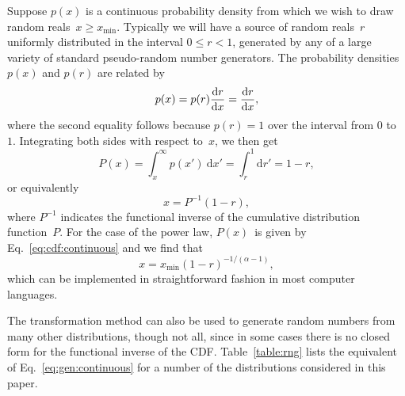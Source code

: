 \documentclass[final]{siamltex}
\renewcommand{\d}{\mathrm{d}}
\newcommand{\xmin}{\ensuremath{x_{\min}}}
\begin{document}
\begin{appendix}
Suppose $p(x)$ is a continuous probability density from which we wish to
draw random reals~$x\ge\xmin$.  Typically we will have a source of random
reals~$r$ uniformly distributed in the interval $0\le r<1$, generated by
any of a large variety of standard pseudo-random number generators.  The
probability densities $p(x)$ and $p(r)$ are related by
\begin{equation}
p(x) = p(r) {\d r\over\d x} = {\d r\over\d x},
\end{equation}
where the second equality follows because $p(r)=1$ over the interval from
$0$ to~$1$.  Integrating both sides with respect to~$x$, we then get
\begin{equation}
\label{eq:transformation1}
P(x) = \int_x^\infty p(x') \>\d x' = \int_r^1 \d r' = 1 - r,
\end{equation}
or equivalently
\begin{equation}
\label{eq:transformation2}
x = P^{-1}(1-r),
\end{equation}
where $P^{-1}$ indicates the functional inverse of the cumulative
distribution function~$P$.  For the case of the power law, $P(x)$~is given
by Eq.~\eqref{eq:cdf:continuous} and we find that
\begin{equation}
\label{eq:gen:continuous}
x = \xmin(1-r)^{-1/(\alpha-1)},
\end{equation}
which can be implemented in straightforward fashion in most computer
languages.

The transformation method can also be used to generate random numbers from
many other distributions, though not all, since in some cases there is no
closed form for the functional inverse of the CDF.  Table~\ref{table:rng}
lists the equivalent of Eq.~\eqref{eq:gen:continuous} for a number of the
distributions considered in this paper.


\end{appendix}
\end{document}
